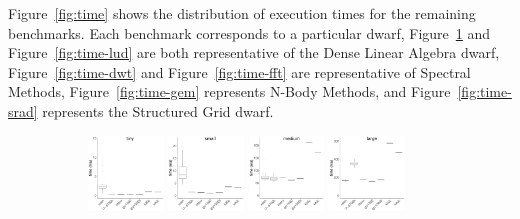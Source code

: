 \documentclass[../document.tex]{subfiles}
\begin{document}
Figure~\ref{fig:time} shows the distribution of execution times for the remaining benchmarks.
Each benchmark corresponds to a particular dwarf, Figure~\ref{fig:time-kmeans} and Figure~\ref{fig:time-lud} are both representative of the Dense Linear Algebra dwarf, Figure~\ref{fig:time-dwt} and Figure~\ref{fig:time-fft} are representative of Spectral Methods,
Figure~\ref{fig:time-gem} represents N-Body Methods, and Figure~\ref{fig:time-srad} represents the Structured Grid dwarf.

\captionsetup[subfigure]{justification=raggedright,singlelinecheck=false}

\begin{figure}
	\begin{subfigure}{0.09\textwidth} \label{fig:time-kmeans} \vspace{5mm}\end{subfigure}
	\begin{subfigure}{0.9\textwidth}
		\includegraphics[width=0.22\textwidth]{figures/time-results/generate_kmeans_no_knl_tiny_boxplot-1}
		\includegraphics[width=0.22\textwidth]{figures/time-results/generate_kmeans_no_knl_small_boxplot-1}
		\includegraphics[width=0.22\textwidth]{figures/time-results/generate_kmeans_no_knl_medium_boxplot-1}
		\includegraphics[width=0.22\textwidth]{figures/time-results/generate_kmeans_no_knl_large_boxplot-1}
	\end{subfigure}


\end{figure}
\end{document}

